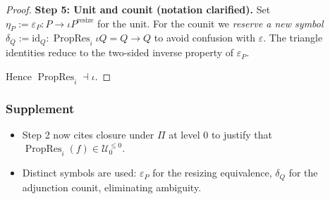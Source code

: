 \documentclass[a4paper,11pt]{article}
\newcommand{\resize}{\mathrm{resize}}
\begin{document}
\begin{proof}
\smallskip
\textbf{Step 5: Unit and counit (notation clarified).}
Set
\(
  \eta_{P}:=\varepsilon_{P}\colon
     P\to\iota P^{\resize}
\)
for the unit.
For the counit we \emph{reserve a new symbol}
\(
  \delta_{Q}:=\mathrm{id}_{Q}\colon
     \operatorname{PropRes}_{i}\iota Q=Q\to Q
\)
to avoid confusion with $\varepsilon$.
The triangle identities reduce to the two-sided inverse property of
$\varepsilon_{P}$.

Hence $\operatorname{PropRes}_{i}\dashv\iota$.
\end{proof}

\subsubsection*{Supplement}
\begin{itemize}
  \item[(J01)]  
        Step 2 now cites closure under $\Pi$ at
        level 0 to justify that $\operatorname{PropRes}_{i}(f)\in
        \mathcal U_{0}^{\le 0}$.
  \item[(J02)]  
        Distinct symbols are used:  
        $\varepsilon_{P}$ for the resizing equivalence,  
        $\delta_{Q}$ for the adjunction counit, eliminating ambiguity.
\end{itemize}
\end{document}
